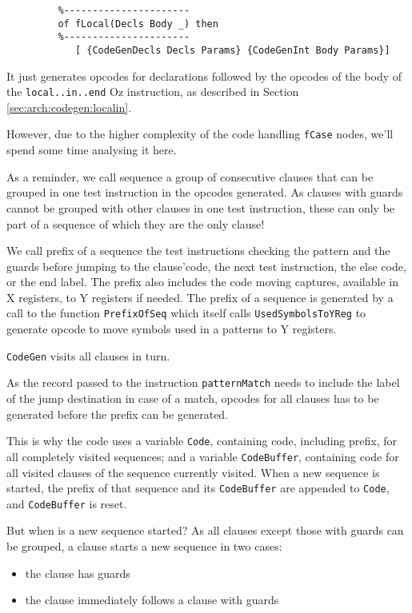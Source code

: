 \documentclass[a4paper]{memoir}
\begin{document}
\begin{lstlisting}
         %----------------------
         of fLocal(Decls Body _) then
         %----------------------
            [ {CodeGenDecls Decls Params} {CodeGenInt Body Params}]
\end{lstlisting}

It just generates opcodes for declarations followed by the opcodes of the body
of the \lstinline!local..in..end! Oz instruction, as described in Section
\ref{sec:arch:codegen:localin}.

However, due to the higher complexity of the code handling \lstinline!fCase! nodes, we'll
spend some time analysing it here.

As a reminder, we call sequence a group of consecutive clauses that can be
grouped in one test instruction in the opcodes generated. As clauses with guards
cannot be grouped with other clauses in one test instruction, these
can only be part of a sequence of which they are the only clause!

We call prefix of a sequence the test
instructions checking the pattern and the guards before jumping to the
clause'code, the next test instruction, the else code, or the end label.
The prefix also includes the code moving captures, available in X registers,
to Y registers if needed.
The prefix of a sequence is generated by a call to the function
\lstinline!PrefixOfSeq! which itself calls \lstinline!UsedSymbolsToYReg! to
generate opcode to move symbols used in a patterns to Y registers.

\lstinline!CodeGen! visits all clauses in turn.

As the record passed to the instruction \lstinline!patternMatch! needs to
include the label of the jump destination in case of a match, opcodes for all
clauses has to be generated before the prefix can be generated.

This is why the code uses a variable \lstinline!Code!, containing code,
including prefix, for all completely visited sequences; and a variable
\lstinline!CodeBuffer!, containing code for all visited clauses of the sequence
currently visited. When a new sequence is started, the prefix of that sequence
and its \lstinline!CodeBuffer! are appended to \lstinline!Code!, and
\lstinline!CodeBuffer! is reset.

But when is a new sequence started? As all clauses except those with guards can
be grouped, a clause starts a new sequence in two cases:
\begin{itemize}
  \item the clause has guards
  \item the clause immediately follows a clause with guards
\end{itemize}
\end{document}
